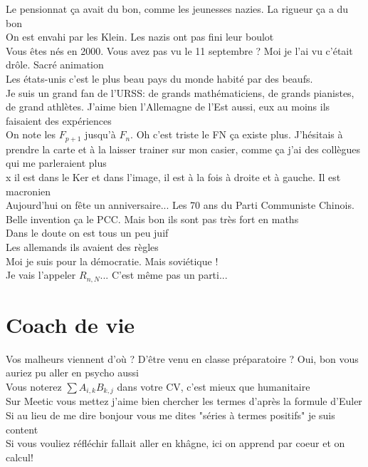 \documentclass[french, a4paper, openany]{book}
\begin{document}
	\noindent \og Le pensionnat ça avait du bon, comme les jeunesses nazies. La rigueur ça a du bon \fg \\
	\og On est envahi par les Klein. Les nazis ont pas fini leur boulot \fg \\
	\og Vous êtes nés en 2000. Vous avez pas vu le 11 septembre ? Moi je l'ai vu c'était drôle. Sacré animation \fg \\
	\og Les états-unis c'est le plus beau pays du monde habité par des beaufs. \fg \\
	\og Je suis un grand fan de l'URSS: de grands mathématiciens, de grands pianistes, de grand athlètes. J'aime bien l'Allemagne de l'Est aussi, eux au moins ils faisaient des expériences \fg \\
	\og On note les $F_{p+1}$ jusqu'à $F_n$. Oh c'est triste le FN ça existe plus. J'hésitais à prendre la carte et à la laisser trainer sur mon casier, comme ça j'ai des collègues qui me parleraient plus \fg \\
	\og x il est dans le Ker et dans l'image, il est à la fois à droite et à gauche. Il est macronien \fg \\
	\og Aujourd'hui on fête un anniversaire... Les 70 ans du Parti Communiste Chinois. Belle invention ça le PCC. Mais bon ils sont pas très fort en maths \fg \\
	\og Dans le doute on est tous un peu juif \fg \\
	\og Les allemands ils avaient des règles \fg \\
	\og Moi je suis pour la démocratie. Mais soviétique ! \fg \\
	\og Je vais l'appeler $R_{n,N}$... C'est même pas un parti... \fg \\

\section{Coach de vie}

	\noindent \og Vos malheurs viennent d'où ? D'être venu en classe préparatoire ? Oui, bon vous auriez pu aller en psycho aussi \fg \\
	\og Vous noterez $\sum A_{i,k} B_{k,j}$ dans votre CV, c'est mieux que humanitaire \fg \\
	\og Sur Meetic vous mettez \og j'aime bien chercher les termes d'après la formule d'Euler \fg \\
	\og Si au lieu de me dire bonjour vous me dites "séries à termes positifs" je suis content \fg \\
	\og Si vous vouliez réfléchir fallait aller en khâgne, ici on apprend par coeur et on calcul! \fg \\
\end{document}

